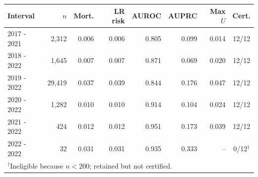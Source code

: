 \begin{tabular}{lrrrrrrc}
\toprule
Interval & $n$ & Mort. & LR risk & AUROC & AUPRC & Max $U$ & Cert. \\
\midrule
2017 - 2021 & 2,312 & 0.006 & 0.006 & 0.805 & 0.099 & 0.014 & 12/12 \\
2018 - 2022 & 1,645 & 0.007 & 0.007 & 0.871 & 0.069 & 0.020 & 12/12 \\
2019 - 2022 & 29,419 & 0.037 & 0.039 & 0.844 & 0.176 & 0.047 & 12/12 \\
2020 - 2022 & 1,282 & 0.010 & 0.010 & 0.914 & 0.104 & 0.024 & 12/12 \\
2021 - 2022 & 424 & 0.012 & 0.012 & 0.951 & 0.173 & 0.039 & 12/12 \\
2022 - 2022 & 32 & 0.031 & 0.031 & 0.935 & 0.333 & -- & 0/12$^\dagger$ \\
\bottomrule
\multicolumn{8}{l}{\footnotesize $^\dagger$Ineligible because $n<200$; retained but not certified.}
\end{tabular}
